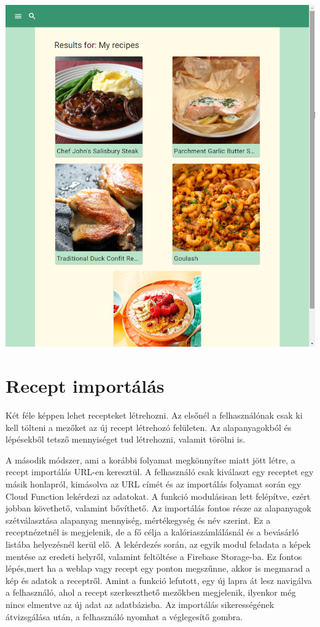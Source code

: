 \documentclass[12pt]{report}
\theoremstyle{definition}
\begin{document}
\includegraphics[scale=0.4]{pictures/web_recipeCollection.png}

\section{Recept importálás}
Két féle képpen lehet recepteket létrehozni. Az elsőnél a felhasználónak csak ki kell tölteni a mezőket az új recept létrehozó felületen. Az alapanyagokból és lépésekből tetsző mennyiséget tud létrehozni, valamit törölni is.

A második módszer, ami a korábbi folyamat megkönnyítse miatt jött létre, a recept importálás URL-en keresztül. A felhasználó csak kiválaszt egy receptet egy másik honlapról, kimásolva az URL címét és az importálás folyamat során egy Cloud Function lekérdezi az adatokat. A funkció modulásisan lett felépítve, ezért jobban követhető, valamint bővíthető. Az importálás fontos része az alapanyagok szétválasztása alapanyag mennyiség, mértékegység és név szerint. Ez a receptnézetnél is megjelenik, de a fő célja a kalóriaszámlálásnál és a bevásárló listába helyezésnél kerül elő. A lekérdezés során, az egyik modul feladata a képek mentése az eredeti helyről, valamint feltöltése a Firebase Storage-ba. Ez fontos lépés,mert ha a weblap vagy recept egy ponton megszűnne, akkor is megmarad a  kép és adatok a receptről. Amint a funkció lefutott, egy új lapra át lesz navigálva a felhasználó, ahol a recept szerkeszthető mezőkben megjelenik, ilyenkor még nincs elmentve az új adat az adatbázisba. Az importálás sikerességének átvizsgálása után, a felhasználó nyomhat a véglegesítő gombra.
\end{document}
